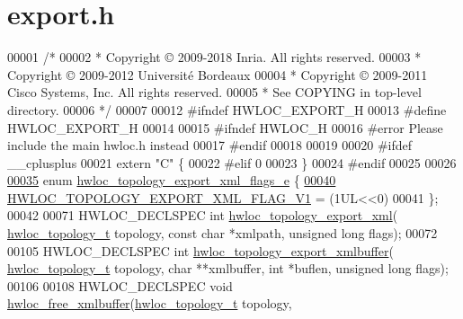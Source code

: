 \hypertarget{a00128_source}{}\section{export.\+h}
\label{a00128_source}

\begin{DoxyCode}
00001 \textcolor{comment}{/*}
00002 \textcolor{comment}{ * Copyright © 2009-2018 Inria.  All rights reserved.}
00003 \textcolor{comment}{ * Copyright © 2009-2012 Université Bordeaux}
00004 \textcolor{comment}{ * Copyright © 2009-2011 Cisco Systems, Inc.  All rights reserved.}
00005 \textcolor{comment}{ * See COPYING in top-level directory.}
00006 \textcolor{comment}{ */}
00007 
00012 \textcolor{preprocessor}{#ifndef HWLOC\_EXPORT\_H}
00013 \textcolor{preprocessor}{#define HWLOC\_EXPORT\_H}
00014 
00015 \textcolor{preprocessor}{#ifndef HWLOC\_H}
00016 \textcolor{preprocessor}{#error Please include the main hwloc.h instead}
00017 \textcolor{preprocessor}{#endif}
00018 
00019 
00020 \textcolor{preprocessor}{#ifdef \_\_cplusplus}
00021 \textcolor{keyword}{extern} \textcolor{stringliteral}{"C"} \{
00022 \textcolor{preprocessor}{#elif 0}
00023 \}
00024 \textcolor{preprocessor}{#endif}
00025 
00026 
\hyperlink{a00206_ga0eb99636aff71fe2704e1fa0ffe8c18d}{00035} \textcolor{keyword}{enum} \hyperlink{a00206_ga0eb99636aff71fe2704e1fa0ffe8c18d}{hwloc\_topology\_export\_xml\_flags\_e} \{
\hyperlink{a00206_gga0eb99636aff71fe2704e1fa0ffe8c18dae7d6d96546131ef0043867b836b02e0f}{00040}  \hyperlink{a00206_gga0eb99636aff71fe2704e1fa0ffe8c18dae7d6d96546131ef0043867b836b02e0f}{HWLOC\_TOPOLOGY\_EXPORT\_XML\_FLAG\_V1} = (1UL<<0)
00041 \};
00042 
00071 HWLOC\_DECLSPEC \textcolor{keywordtype}{int} \hyperlink{a00206_ga333f79975b4eeb28a3d8fad3373583ce}{hwloc\_topology\_export\_xml}(
      \hyperlink{a00186_ga9d1e76ee15a7dee158b786c30b6a6e38}{hwloc\_topology\_t} topology, \textcolor{keyword}{const} \textcolor{keywordtype}{char} *xmlpath, \textcolor{keywordtype}{unsigned} \textcolor{keywordtype}{long} flags);
00072 
00105 HWLOC\_DECLSPEC \textcolor{keywordtype}{int} \hyperlink{a00206_gad33b7f7c11db10459505a3b1634fd3f1}{hwloc\_topology\_export\_xmlbuffer}(
      \hyperlink{a00186_ga9d1e76ee15a7dee158b786c30b6a6e38}{hwloc\_topology\_t} topology, \textcolor{keywordtype}{char} **xmlbuffer, \textcolor{keywordtype}{int} *buflen, \textcolor{keywordtype}{unsigned} \textcolor{keywordtype}{long} flags);
00106 
00108 HWLOC\_DECLSPEC \textcolor{keywordtype}{void} \hyperlink{a00206_ga293e4a6489f15fd16ad22a5734561cf1}{hwloc\_free\_xmlbuffer}(\hyperlink{a00186_ga9d1e76ee15a7dee158b786c30b6a6e38}{hwloc\_topology\_t} topology, \textcolor{keywordtype}{
}
\end{DoxyCode}

